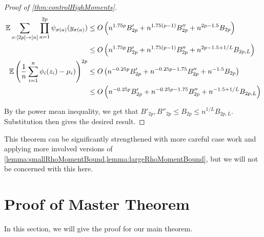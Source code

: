 \documentclass[main.tex]{subfiles}
\begin{document}
\begin{proof}[Proof of \cref{thm:controlHighMoments}]
\begin{align*}
    \operatorname*{\mathbb{E}} \sum_{\sigma: [2p] \to [n]} \prod_{a=1}^{2p} \psi_{\sigma(a)}(y_{\sigma(a)})
    &\le
        O\left(
        n^{1.75p} B'_{2p}
        + n^{1.75(p-1)} B''_{2p}
        + n^{2p-1.5} B_{2p}
        \right)
        \\
    &\le
        O\left(
        n^{1.75p} B'_{2p}
        + n^{1.75(p-1)} B''_{2p}
        + n^{2p-1.5+1/L} B_{2p, L}
        \right)
        \\
    \operatorname*{\mathbb{E}} \left( \frac{1}{n} \sum_{i=1}^n \phi_i(z_i) - \mu_i)\right)^{2p}
        &\le
           O\left(
            n^{-0.25 p} B'_{2p}
            + n^{-0.25 p - 1.75} B''_{2p}
            + n^{-1.5} B_{2p}
            \right)
            \\
        &\le
           O\left(
            n^{-0.25 p} B'_{2p}
            + n^{-0.25 p - 1.75} B''_{2p}
            + n^{-1.5+1/L} B_{2p, L}
            \right)
\end{align*}

By the power mean inequality, we get that $B'_{2p}, B''_{2p} \le B_{2p} \le n^{1/L} B_{2p,L}$.
Substitution then gives the desired result.

\end{proof}

This theorem can be significantly strengthened with more careful case work and applying more involved versions of \cref{lemma:smallRhoMomentBound,lemma:largeRhoMomentBound}, but we will not be concerned with this here.

\section{Proof of \netsort{} Master Theorem}
\label{sec:proofMainTheorem}
\renewcommand{\nu}{\eta}
\newcommand{\rankext}[1]{{\color{green}#1}}

\newcommand{\coreset}{{\mathcal{M}}}
\newcommand{\basespace}{\mathsf{U}}
\newcommand{\MM}{m}

In this section, we will give the proof for our main theorem.
\end{document}
